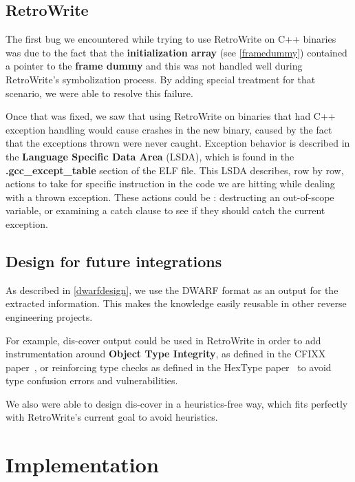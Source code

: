 \documentclass[a4paper,11pt,oneside]{report}
\begin{document}
\section{RetroWrite}
\label{retrowritedesign}

The first bug we encountered while trying to use RetroWrite on C++ binaries
was due to the fact that the \textbf{initialization array} (see
\autoref{framedummy}) contained a pointer to the \textbf{frame dummy} and this
was not handled well during RetroWrite's symbolization process.
By adding special treatment for that scenario, we were able to resolve this
failure.

Once that was fixed, we saw that using RetroWrite on binaries that had C++
exception handling would cause crashes in the new binary, caused by the fact
that the exceptions thrown were never caught.
Exception behavior is described in the \textbf{Language Specific Data Area}
(LSDA), which is found in the \textbf{.gcc\_except\_table} section of the ELF
file.
This LSDA describes, row by row, actions to take for specific instruction in
the code we are hitting while dealing with a thrown exception. These actions
could be : destructing an out-of-scope variable, or examining a catch clause
to see if they should catch the current exception.

\section{Design for future integrations}

As described in \autoref{dwarfdesign}, we use the DWARF format as an output
for the extracted information. This makes the knowledge easily reusable in
other reverse engineering projects.

For example, dis-cover output could be used in RetroWrite in order to add
instrumentation around \textbf{Object Type Integrity}, as defined in the CFIXX
paper~\cite{cfixx}, or reinforcing type checks as defined in the HexType
paper~\cite{hextype} to avoid type confusion errors and vulnerabilities.

We also were able to design dis-cover in a heuristics-free way, which fits
perfectly with RetroWrite's current goal to avoid heuristics.


\chapter{Implementation}
\end{document}
